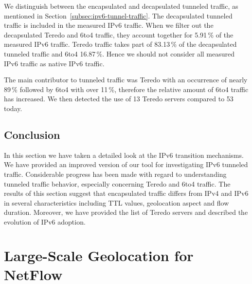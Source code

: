 We distinguish between the encapsulated and decapsulated tunneled traffic, as mentioned in Section~\ref{subsec:ipv6-tunnel-traffic}. The decapsulated tunneled traffic is included in the measured IPv6 traffic. When we filter out the decapsulated Teredo and 6to4 traffic, they account together for 5.91\,\% of the measured IPv6 traffic. Teredo traffic takes part of 83.13\,\% of the decapsulated tunneled traffic and 6to4 16.87\,\%. Hence we should not consider all measured IPv6 traffic as native IPv6 traffic.

The main contributor to tunneled traffic was Teredo with an occurrence of nearly 89\,\% followed by 6to4 with over 11\,\%, therefore the relative amount of 6to4 traffic has increased. We then detected the use of 13 Teredo servers compared to 53 today. %

\subsection{Conclusion} \label{subsec:ipv6-tunnels-conclusion}

In this section we have taken a detailed look at the IPv6 transition mechanisms. We have provided an improved version of our tool for investigating IPv6 tunneled traffic. Considerable progress has been made with regard to understanding tunneled traffic behavior, especially concerning Teredo and 6to4 traffic. The results of this section suggest that encapsulated traffic differs from IPv4 and IPv6 in several characteristics including TTL values, geolocation aspect and flow duration. Moreover, we have provided the list of Teredo servers and described the evolution of IPv6 adoption.

\section{Large-Scale Geolocation for NetFlow}\label{sec:analysis-geolocation}



